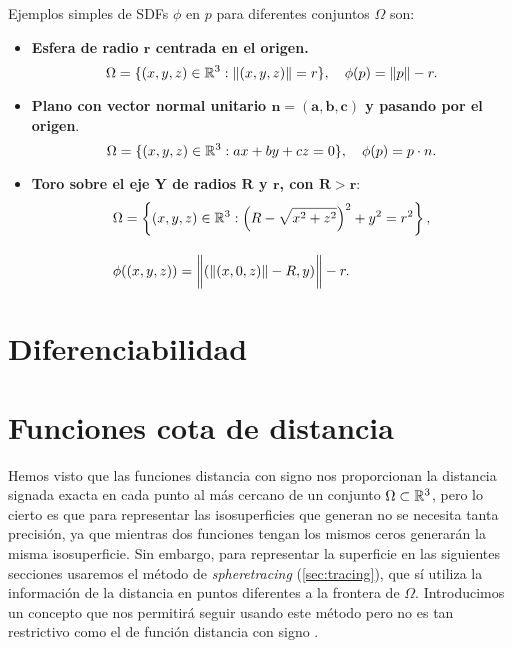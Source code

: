 \begin{ejemplo}\label{ej:sdf}
    Ejemplos simples de SDFs $\phi$ en $p$ para diferentes conjuntos $\Omega$ son:
    \begin{itemize}
        \item \textbf{Esfera de radio $\boldsymbol{r}$ centrada en el origen.}
        \begin{equation*}
            \Omega=\{(x,y,z)\in \mathbb{R}^3 : \Vert (x,y,z)\Vert = r\},\quad \phi(p) = \Vert p\Vert - r.
        \end{equation*}
        \item \textbf{Plano con vector normal unitario $\boldsymbol{n=(a,b,c)}$ y pasando por el origen}.
        \begin{equation*}
            \Omega=\{(x,y,z)\in\mathbb{R}^3 : ax+by+cz = 0\},\quad \phi(p) = p\cdot n.
        \end{equation*}
        \item \textbf{Toro sobre el eje Y de radios $\boldsymbol{R}$ y $\boldsymbol{r}$, con $\boldsymbol{R>r}$}:
        \begin{align*}
            &\Omega=\left\{(x,y,z)\in \mathbb{R}^3 : \left(R-\sqrt{x^2+z^2}\right)^2 + y^2 = r^2\right\},\\[10pt]
            &\phi((x,y,z))= \bigg\Vert (\Vert(x,0,z)\Vert - R, y) \bigg\Vert - r.
        \end{align*}
    \end{itemize}
\end{ejemplo}

\section{Diferenciabilidad}


\section{Funciones cota de distancia}
Hemos visto que las funciones distancia con signo nos proporcionan la distancia signada exacta en cada punto al más cercano de un conjunto $\Omega\subset \mathbb{R}^3$, pero lo cierto es que para representar las isosuperficies que generan no se necesita tanta precisión, ya que mientras dos funciones tengan los mismos ceros generarán la misma isosuperficie. Sin embargo, para representar la superficie en las siguientes secciones usaremos el método de \textit{spheretracing} (\autoref{sec:tracing}), que sí utiliza la información de la distancia en puntos diferentes a la frontera de $\Omega$. Introducimos un concepto que nos permitirá seguir usando este método pero no es tan restrictivo como el de función distancia con signo \cite{hart}.

